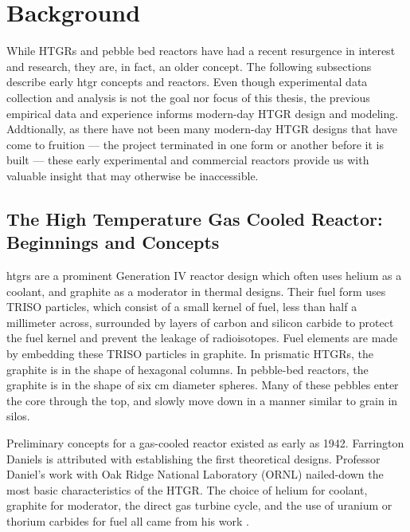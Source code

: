 \section{Background}
\label{sec:intro-background}

While HTGRs and pebble bed reactors have had a recent resurgence in interest and research, they are, in fact, an older concept.  The following subsections describe early \acrshort{htgr} concepts and reactors.  Even though experimental data collection and analysis is not the goal nor focus of this thesis, the previous empirical data and experience informs modern-day HTGR design and modeling.  Addtionally, as there have not been many modern-day HTGR designs that have come to fruition --- the project terminated in one form or another before it is built --- these early experimental and commercial reactors provide us with valuable insight that may otherwise be inaccessible.

\subsection{The High Temperature Gas Cooled Reactor: Beginnings and Concepts}

\acrshort{htgr}s are a prominent Generation IV reactor design which often uses helium as a coolant, and graphite as a moderator in thermal designs.  Their fuel form uses TRISO particles, which consist of a small kernel of fuel, less than half a millimeter across, surrounded by layers of carbon and silicon carbide to protect the fuel kernel and prevent the leakage of radioisotopes.  Fuel elements are made by embedding these TRISO particles in graphite.  In prismatic HTGRs, the graphite is in the shape of hexagonal columns.  In pebble-bed reactors, the graphite is in the shape of six cm diameter spheres.  Many of these pebbles enter the core through the top, and slowly move down in a manner similar to grain in silos.

Preliminary concepts for a gas-cooled reactor existed as early as 1942.  Farrington Daniels is attributed with establishing the first theoretical designs.  Professor Daniel's work with Oak Ridge National Laboratory (ORNL) nailed-down the most basic characteristics of the HTGR.  The choice of helium for coolant, graphite for moderator, the direct gas turbine cycle, and the use of uranium or thorium carbides for fuel all came from his work \cite{simnad_early_1991}.




